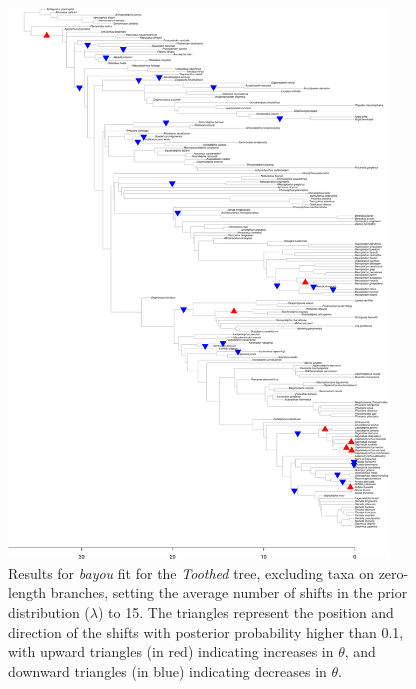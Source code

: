 \begin{figure}[H]
\includegraphics[width=0.9\textwidth]{img/plots-toothed-k15-1.pdf}
\caption{Results for \textit{bayou} fit for the \textit{Toothed} tree, excluding taxa on zero-length branches, setting the average number of shifts in the prior distribution ($\lambda$) to 15. The triangles represent the position and direction of the shifts with posterior probability higher than 0.1, with upward triangles (in red) indicating increases in $\theta$, and downward triangles (in blue) indicating decreases in $\theta$.}
\label{fig:toothed-k15-nzlb}
\end{figure}

\newpage

